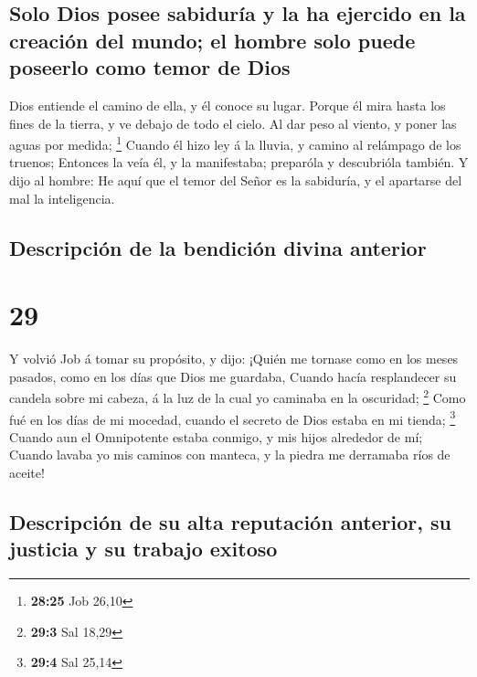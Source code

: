 \hypertarget{solo-dios-posee-sabiduruxeda-y-la-ha-ejercido-en-la-creaciuxf3n-del-mundo-el-hombre-solo-puede-poseerlo-como-temor-de-dios}{%
\subsection{Solo Dios posee sabiduría y la ha ejercido en la creación
del mundo; el hombre solo puede poseerlo como temor de
Dios}\label{solo-dios-posee-sabiduruxeda-y-la-ha-ejercido-en-la-creaciuxf3n-del-mundo-el-hombre-solo-puede-poseerlo-como-temor-de-dios}}

 Dios entiende el camino de ella, y él conoce su lugar.
 Porque él mira hasta los fines de la tierra, y ve debajo
de todo el cielo.  Al dar peso al viento, y poner las aguas
por medida; \footnote{\textbf{28:25} Job 26,10}  Cuando él
hizo ley á la lluvia, y camino al relámpago de los truenos;
 Entonces la veía él, y la manifestaba; preparóla y
descubrióla también.  Y dijo al hombre: He aquí que el
temor del Señor es la sabiduría, y el apartarse del mal la inteligencia.

\hypertarget{descripciuxf3n-de-la-bendiciuxf3n-divina-anterior}{%
\subsection{Descripción de la bendición divina
anterior}\label{descripciuxf3n-de-la-bendiciuxf3n-divina-anterior}}

\hypertarget{section-28}{%
\section{29}\label{section-28}}

 Y volvió Job á tomar su propósito, y dijo: 
¡Quién me tornase como en los meses pasados, como en los días que Dios
me guardaba,  Cuando hacía resplandecer su candela sobre mi
cabeza, á la luz de la cual yo caminaba en la oscuridad; \footnote{\textbf{29:3}
  Sal 18,29}  Como fué en los días de mi mocedad, cuando el
secreto de Dios estaba en mi tienda; \footnote{\textbf{29:4} Sal 25,14}
 Cuando aun el Omnipotente estaba conmigo, y mis hijos
alrededor de mí;  Cuando lavaba yo mis caminos con manteca,
y la piedra me derramaba ríos de aceite!

\hypertarget{descripciuxf3n-de-su-alta-reputaciuxf3n-anterior-su-justicia-y-su-trabajo-exitoso}{%
\subsection{Descripción de su alta reputación anterior, su justicia y su
trabajo
exitoso}\label{descripciuxf3n-de-su-alta-reputaciuxf3n-anterior-su-justicia-y-su-trabajo-exitoso}}

